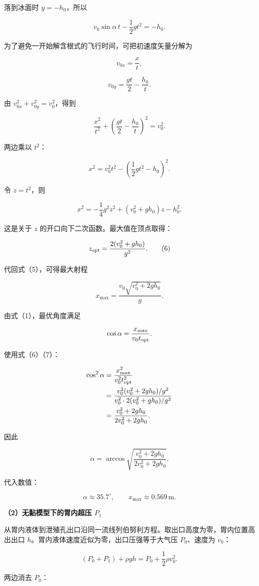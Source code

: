 \documentclass[12pt,a4paper,UTF8]{ctexart}
\begin{document}
落到冰面时 \(y=-h_0\)，所以

\[
v_0\sin\alpha\,t-\frac12gt^2=-h_0.
\tag{3}
\]

为了避免一开始解含根式的飞行时间，可把初速度矢量分解为

\[
v_{0x}=\frac{x}{t},
\]

\[
v_{0y}=\frac{gt}{2}-\frac{h_0}{t}.
\]

由 \(v_{0x}^2+v_{0y}^2=v_0^2\)，得到

\[
\frac{x^2}{t^2}+\left(\frac{gt}{2}-\frac{h_0}{t}\right)^2=v_0^2.
\]

两边乘以 \(t^2\)：

\[
x^2=v_0^2t^2-\left(\frac12gt^2-h_0\right)^2.
\tag{4}
\]

令 \(z=t^2\)，则

\[
x^2=-\frac14g^2z^2+(v_0^2+gh_0)z-h_0^2.
\tag{5}
\]

这是关于 \(z\) 的开口向下二次函数。最大值在顶点取得：

\[
z_{\rm opt}=\frac{2(v_0^2+gh_0)}{g^2}.
\tag{6}
\]

代回式（5），可得最大射程

\[
\boxed{x_{\max}=\frac{v_0\sqrt{v_0^2+2gh_0}}{g}}.
\tag{7}
\]

由式（1），最优角度满足

\[
\cos\alpha=\frac{x_{\max}}{v_0t_{\rm opt}}.
\]

使用式（6）（7）：

\[
\begin{aligned}
\cos^2\alpha
&=\frac{x_{\max}^2}{v_0^2t_{\rm opt}^2}\\
&=\frac{v_0^2(v_0^2+2gh_0)/g^2}
{v_0^2\cdot2(v_0^2+gh_0)/g^2}\\
&=\frac{v_0^2+2gh_0}{2v_0^2+2gh_0}.
\end{aligned}
\]

因此

\[
\boxed{
\alpha=\arccos\sqrt{\frac{v_0^2+2gh_0}{2v_0^2+2gh_0}}
}.
\tag{8}
\]

代入数值：

\[
\boxed{\alpha\approx35.7^\circ},
\qquad
x_{\max}\approx0.569\,\mathrm m.
\tag{9}
\]

\textbf{（2）无黏模型下的胃内超压 \(P_1\)}

从胃内液体到泄殖孔出口沿同一流线列伯努利方程。取出口高度为零，胃内位置高出出口
\(h\)。胃内液体速度近似为零，出口压强等于大气压 \(P_0\)、速度为
\(v_0\)：

\[
(P_0+P_1)+\rho gh
=P_0+\frac12\rho v_0^2.
\tag{10}
\]

两边消去 \(P_0\)：
\end{document}
